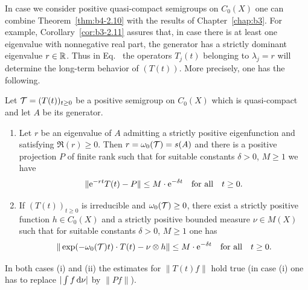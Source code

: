In case we consider positive quasi-compact semigroups on $C_{0}(X)$ one can combine Theorem~\ref{thm:b4-2.10} with the results of Chapter~\ref{chap:b3}. 
For example, Corollary~\ref{cor:b3-2.11} assures that, in case there is at least one eigenvalue with nonnegative real part, the generator has a strictly dominant eigenvalue $r \in \mathbb{R}$. 
Thus in Eq.~ the operators $T_j(t)$ belonging to $\lambda_j = r$ will determine the long-term behavior of\/ $(T(t))$. More precisely, one has the following.
\begin{corollary}\label{cor:b4-2.11}%
%
Let $\TT = (T(t))_{t \geq 0}$ be a positive semigroup on $C_{0}(X)$ which is quasi-compact and let $A$ be its generator.
\begin{enumerate}[\upshape (i)]
	\item	
	Let $r$ be an eigenvalue of\/ $A$ admitting a strictly positive eigenfunction and satisfying $\Re(r) \geq 0$. 
    Then $r = \omega_{0}(\mathcal{T}) = s(A)$ and there is a positive projection $P$ of finite rank such that for suitable constants $\delta > 0$, $M \geq 1$ we have
	\begin{equation}\label{eq:b4-2.6}
		\|\eu^{-rt}T(t) - P\| \leq M \cdot \eu^{-\delta t} \quad \text{for all} \quad t \geq 0 \text{.}
	\end{equation}
	
	\item 
	If\/ $(T(t))_{t \geq 0}$ is irreducible and $\omega_{0}(\TT) \geq 0$, there exist a strictly positive function $h \in C_{0}(X)$ and a strictly positive bounded measure $\nu \in M(X)$ such that for suitable constants $\delta > 0$, $M \geq 1$ one has
	\begin{equation}\label{eq:b4-2.7}
		\|\exp(-\omega_{0}(\TT)t) \cdot T(t) - \nu \otimes h\| \leq M \cdot \eu^{-\delta t} \quad \text{for all} \quad t \geq 0 \text{.}
	\end{equation}
\end{enumerate}
In both cases (i) and (ii) the estimates  for $\|T(t)f\|$ hold true (in case (i) one has to replace $|\int f \mathop{}\!\mathrm{d}{\nu}|$ by $\|Pf\|$).
\end{corollary}
